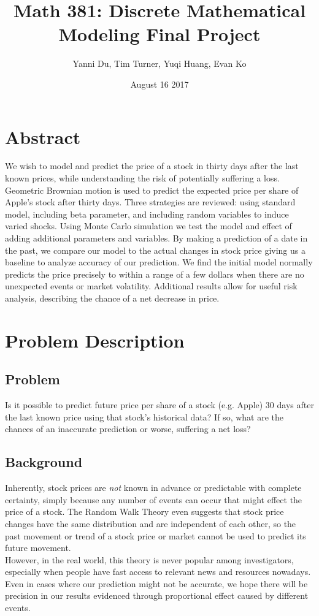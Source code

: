 \documentclass{article}
\title{Math 381: Discrete Mathematical Modeling Final Project}
\author{Yanni Du, Tim Turner, Yuqi Huang, Evan Ko }
\affil{University of Washington}
\date{August 16 2017}
\begin{document}
	
\maketitle
\newpage
\tableofcontents
\newpage

\section{Abstract}

We wish to model and predict the price of a stock in thirty days after the last known prices, while understanding the risk of potentially suffering a loss. Geometric Brownian motion is used to predict the expected price per share of Apple's stock after thirty days. Three strategies are reviewed: using standard model, including beta parameter, and including random variables to induce varied shocks. Using Monte Carlo simulation we test the model and effect of adding additional parameters and variables. By making a prediction of a date in the past, we compare our model to the actual changes in stock price giving us a baseline to analyze accuracy of our prediction. We find the initial model normally predicts the price precisely to within a range of a few dollars when there are no unexpected events or market volatility. Additional results allow for useful risk analysis, describing the chance of a net decrease in price.

\section{Problem Description}
\subsection{Problem}
Is it possible to predict future price per share of a stock (e.g. Apple) 30 days after the last known price using that stock's historical data? If so, what are the chances of an inaccurate prediction or worse, suffering a net loss?

\subsection{Background}
Inherently, stock prices are \textit{not} known in advance or predictable with complete certainty, simply because any number of events can occur that might effect the price of a stock. The Random Walk Theory even suggests that stock price changes have the same distribution and are independent of each other, so the past movement or trend of a stock price or market cannot be used to predict its future movement.\cite{RW}\\
However, in the real world, this theory is never popular among investigators, especially when people have fast access to relevant news and resources nowadays. Even in cases where our prediction might not be accurate, we hope there will be precision in our results evidenced through proportional effect caused by different events.
\end{document}
